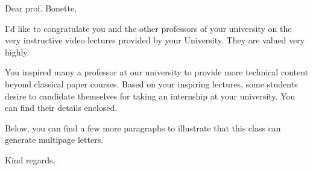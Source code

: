 \documentclass[ti,a4paper]{uantwerpenletter}
\date{January 3, 2016}
\begin{document}
  \maketitle

  \opening{Dear prof. Bonette,}

  I'd like to congratulate you and the other professors of your
  university on the very instructive video lectures
  provided by your University. They are valued very
  highly.

  You inspired many a professor at our university to provide more
  technical content beyond classical paper courses.
  Based on your inspiring lectures, some students desire to candidate
  themselves for taking an internship at your university. You can find
  their details enclosed.

  Below, you can find a few more paragraphs to illustrate that this
  class can generate multipage letters.

  \kant[1-3]

  \closing{Kind regards,}
\end{document}
